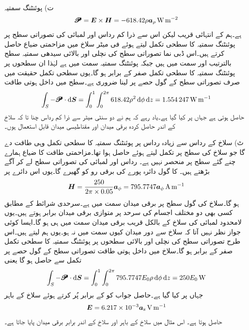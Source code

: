 ت) پوئنٹنگ سمتیہ
\begin{align*}
\pmb{\mathscr{P}}={{\boldsymbol{E}}} \times {\ensuremath{{\boldsymbol{H}}}}=-618.42 \rho {\boldsymbol{a}}_{\rho} \, \si{\watt\per\meter\squared}
\end{align*}
 ہے۔ہم  کے انتہائی قریب لیکن اس سے ذرا کم رداس اور  لمبائی کی تصوراتی سطح پر پوئنٹنگ سمتیہ کا سطحی تکمل لیتے ہوئے فی میٹر سلاخ میں مزاحمتی ضیاع حاصل کرتے ہیں۔اس ڈبی نما تصوراتی سطح کی نچلی اور بالائی سیدھی سمتیہ سطح بالترتیب  اور  سمت میں ہیں جبکہ پوئنٹنگ سمتیہ  سمت میں ہے لہٰذا ان سطحوں پر پوئنٹنگ سمتیہ  کا سطحی تکمل صفر کے برابر ہو گا۔یوں سطحی تکمل حقیقت میں صرف تصوراتی سطح کے گول حصے پر لینا ضروری ہے۔سطح میں داخل ہوتی طاقت 
\begin{align*}
\int_S -\pmb{\mathscr{P}} \cdot \dif \kvec{S} =\int_{0}^{1} \int_{0}^{2\pi} 618.42 \rho^2 \dif \phi \dif z=\SI{1.554247}{\watt\per\meter}
\end{align*}
حاصل ہوتی ہے جہاں  پر کیا گیا ہے۔یاد رہے کہ ہم نے دو سنٹی میٹر سے ذرا کم رداس چنا تا کہ سلاخ کے اندر حاصل کردہ برقی میدان اور مقناطیسی میدان قابل استعمال ہوں۔

ٹ) سلاخ کے رداس سے زیادہ رداس پر پوئنٹنگ سمتیہ کا سطحی تکمل وہی طاقت دے گا جو سلاخ کی سطح پر تکمل لیتے ہوئے حاصل ہوا تھا۔مزاحمتی طاقت کا ضیاع ہمارے چنے گئے سطح پر منحصر نہیں ہے۔  رداس اور  لمبائی کی تصوراتی سطح لے کر آگے بڑھتے ہیں۔ کا گول دائرہ پورے  کی برقی رو کو گھیرے گا۔یوں اس دائرے پر 
\begin{align*}
{\ensuremath{{\boldsymbol{H}}}}=\frac{250}{2\pi \times 0.05} {\boldsymbol{a}}_{\phi}=795.7747 {\boldsymbol{a}}_{\phi} \, \si{\ampere\per\meter}
\end{align*}
ہو گا۔سلاخ کی گول سطح پر برقی میدان  سمت میں ہے۔سرحدی شرائط کے مطابق کسی بھی دو مختلف اجسام کی سرحد پر متوازی برقی میدان برابر ہوتے ہیں۔یوں لامحدود لمبائی کی سلاخ کے بالکل قریب برقی میدان  سمت میں ہی ہو گا۔ایسا کوئی جواز نظر نہیں آتا کہ سلاخ سے دور میدان کیوں  سمت میں نہ ہو۔یوں ہم  لیتے ہیں۔اس طرح تصوراتی سطح کی نچلی اور بالائی سطحوں پر پوئنٹنگ سمتیہ کا سطحی تکمل صفر کے برابر ہو گا۔سلاخ میں داخل ہوتی طاقت  تصوراتی سطح کے گول حصے پر تکمل سے حاصل ہو گا یعنی
 \begin{align*}
\int_S -\pmb{\mathscr{P}} \cdot \dif \kvec{S} =\int_{0}^{1} \int_{0}^{2\pi} 795.7747 E_0 \rho \dif \phi \dif z=250 E_0 \, \si{\watt}
\end{align*}
جہاں  پر کیا گیا ہے۔حاصل جواب کو  کے برابر پُر کرتے ہوئے سلاخ کے باہر
\begin{align*}
{\ensuremath{{\boldsymbol{E}}}}=6.217 \times 10^{-3} {\boldsymbol{a}}_{\textup{z}} \, \si{\volt\per\meter}
\end{align*}
حاصل ہوتا ہے۔ اس مثال میں سلاخ کے باہر اور سلاخ کے اندر برابر برقی میدان پایا جاتا ہے۔

